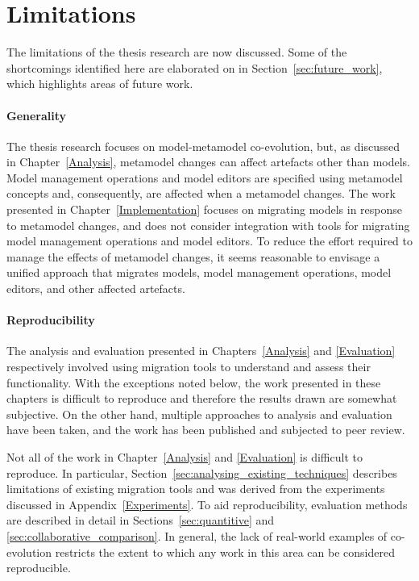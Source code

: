 
\section{Limitations}
\label{sec:limitations}
The limitations of the thesis research are now discussed. Some of the shortcomings identified here are elaborated on in Section~\ref{sec:future_work}, which highlights areas of future work.

\paragraph{Generality} The thesis research focuses on model-metamodel co-evolution, but, as discussed in Chapter~\ref{Analysis}, metamodel changes can affect artefacts other than models. Model management operations and model editors are specified using metamodel concepts and, consequently, are affected when a metamodel changes. The work presented in Chapter~\ref{Implementation} focuses on migrating models in response to metamodel changes, and does not consider integration with tools for migrating model management operations and model editors. To reduce the effort required to manage the effects of metamodel changes, it seems reasonable to envisage a unified approach that migrates models, model management operations, model editors, and other affected artefacts.

\paragraph{Reproducibility} The analysis and evaluation presented in Chapters~\ref{Analysis} and \ref{Evaluation} respectively involved using migration tools to understand and assess their functionality. With the exceptions noted below, the work presented in these chapters is difficult to reproduce and therefore the results drawn are somewhat subjective. On the other hand, multiple approaches to analysis and evaluation have been taken, and the work has been published and subjected to peer review. 

Not all of the work in Chapter~\ref{Analysis} and \ref{Evaluation} is difficult to reproduce. In particular, Section~\ref{sec:analysing_existing_techniques} describes limitations of existing migration tools and was derived from the experiments discussed in Appendix~\ref{Experiments}. To aid reproducibility, evaluation methods are described in detail in Sections~\ref{sec:quantitive} and \ref{sec:collaborative_comparison}. In general, the lack of real-world examples of co-evolution restricts the extent to which any work in this area can be considered reproducible. 

